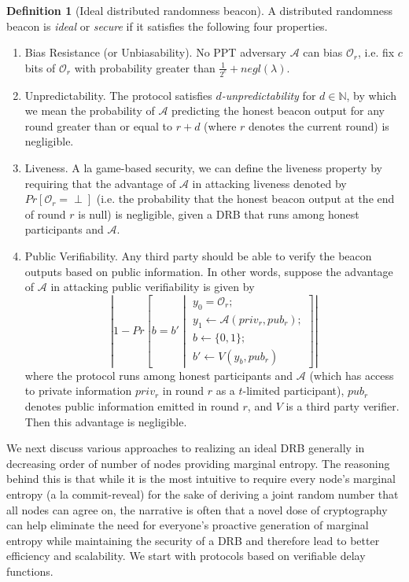 \documentclass[letterpaper,twocolumn,10pt]{article}
\theoremstyle{definition}
\newtheorem{definition}[theorem]{Definition}
\theoremstyle{remark}
\begin{document}
\begin{definition}[Ideal distributed randomness beacon]
A distributed randomness beacon is \textit{ideal} or \textit{secure} if it satisfies the following four properties.
\begin{enumerate}
\item Bias Resistance (or Unbiasability). No PPT adversary $\mathcal{A}$ can bias $\mathcal{O}_r$, i.e. fix $c$ bits of $\mathcal{O}_r$ with probability greater than $\frac{1}{2^c} + negl(\lambda)$.
\item Unpredictability. The protocol satisfies \textit{$d$-unpredictability} for $d \in \mathbb{N}$, by which we mean the probability of $\mathcal{A}$ predicting the honest beacon output for any round greater than or equal to $r + d$ (where $r$ denotes the current round) is negligible.
\item Liveness. A la game-based security, we can define the liveness property by requiring that the advantage of $\mathcal{A}$ in attacking liveness denoted by $Pr[\mathcal{O}_r = \text{$\perp$}]$ (i.e. the probability that the honest beacon output at the end of round $r$ is null) is negligible, given a DRB that runs among honest participants and $\mathcal{A}$.
\item Public Verifiability. Any third party should be able to verify the beacon outputs based on public information. In other words, suppose the advantage of $\mathcal{A}$ in attacking public verifiability is given by
\[
\left\lvert 1 - Pr\left[b = b' \middle\vert \begin{array}{l}
y_0 = \mathcal{O}_r;\\
y_1 \leftarrow \mathcal{A}(priv_r, pub_r);\\
b \leftarrow \{0, 1\};\\
b' \leftarrow V(y_b, pub_r)
\end{array}\right]
\right\rvert
\]
where the protocol runs among honest participants and $\mathcal{A}$ (which has access to private information $priv_r$ in round $r$ as a $t$-limited participant), $pub_r$ denotes public information emitted in round $r$, and $V$ is a third party verifier. Then this advantage is negligible.
\end{enumerate}
\end{definition}

We next discuss various approaches to realizing an ideal DRB generally in decreasing order of number of nodes providing marginal entropy. The reasoning behind this is that while it is the most intuitive to require every node's marginal entropy (a la commit-reveal) for the sake of deriving a joint random number that all nodes can agree on, the narrative is often that a novel dose of cryptography can help eliminate the need for everyone's proactive generation of marginal entropy while maintaining the security of a DRB and therefore lead to better efficiency and scalability. We start with protocols based on verifiable delay functions.
\end{document}
